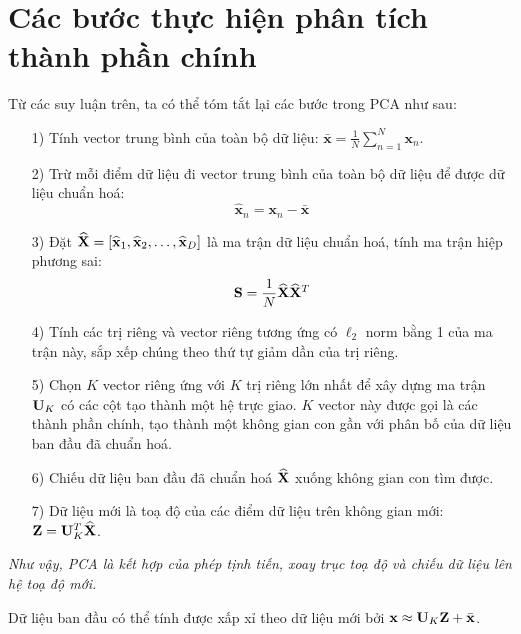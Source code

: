 \section{Các bước thực hiện phân tích thành phần chính}
Từ các suy luận trên, ta có thể tóm tắt lại các bước trong PCA như sau:
\begin{itemize}
\item[1)] Tính vector trung bình của toàn bộ dữ liệu:
\begin{math}
\bar{\mathbf{x}} = \frac{1}{N} \sum_{n=1}^N \mathbf{x}_n
\end{math}.
\item[2)] Trừ mỗi điểm dữ liệu đi vector trung bình của toàn bộ dữ liệu để được dữ
liệu chuẩn hoá:
\begin{equation}
\hat{\mathbf{x}}_n = \mathbf{x}_n - \bar{\mathbf{x}}
\end{equation}
\item[3)] Đặt $\widehat{\mathbf{X}} = [\widehat{\mathbf{x}}_1, \widehat{\mathbf{x}}_2, \dots,
\widehat{\mathbf{x}}_D]$ là ma trận dữ liệu chuẩn hoá, tính ma trận hiệp phương sai:
\begin{equation}
\mathbf{S} = \frac{1}{N}\widehat{\mathbf{X}}\widehat{\mathbf{X}}^T
\end{equation}
\item[4)] Tính các trị riêng và vector riêng tương ứng có $\ell_2$ norm bằng 1
của ma trận này, sắp xếp chúng theo thứ tự giảm dần của trị riêng.
\item[5)] Chọn $K$ vector riêng ứng với $K$ trị riêng lớn nhất để xây dựng ma trận $\mathbf{U}_K$ có các cột tạo thành một hệ trực giao. $K$ vector này được gọi là các thành phần chính, tạo thành một không gian con {gần} với phân bố của dữ liệu ban đầu đã chuẩn hoá.
\item[6)] Chiếu dữ liệu ban đầu đã chuẩn hoá $\widehat{\mathbf{X}}$ xuống không gian con tìm được.
\item[7)] Dữ liệu mới là toạ độ của các điểm dữ liệu trên không gian mới:
\begin{math}
\mathbf{Z} = \mathbf{U}_K^T\widehat{\mathbf{X}}
\end{math}.
\end{itemize}

\textit{Như vậy, PCA là kết hợp của phép tịnh tiến, xoay trục toạ độ và chiếu dữ liệu lên hệ toạ độ mới.}

Dữ liệu ban đầu có thể tính được xấp xỉ theo dữ liệu mới bởi
\begin{math}
\mathbf{x} \approx \mathbf{U}_K\mathbf{Z} + \bar{\mathbf{x}}
\end{math}.

